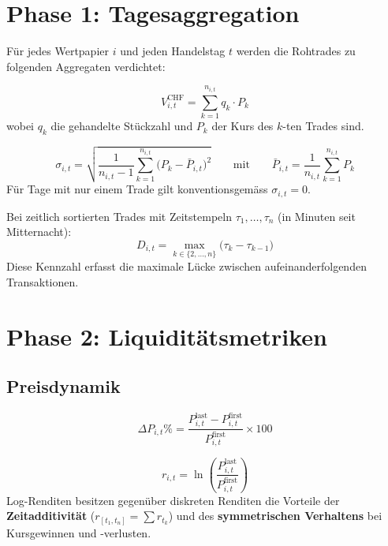 \documentclass[11pt, a4paper, oneside, openany]{report}
\begin{document}
\section{Phase 1: Tagesaggregation}

Für jedes Wertpapier $i$ und jeden Handelstag $t$ werden die Rohtrades zu folgenden Aggregaten verdichtet:

\begin{mathbox}
\[
  V_{i,t}^{\text{CHF}} = \sum_{k=1}^{n_{i,t}} q_k \cdot P_k
\]
wobei $q_k$ die gehandelte Stückzahl und $P_k$ der Kurs des $k$-ten Trades sind.
\end{mathbox}

\begin{mathbox}
\[
  \sigma_{i,t} = \sqrt{\frac{1}{n_{i,t}-1}\sum_{k=1}^{n_{i,t}}\bigl(P_k - \bar{P}_{i,t}\bigr)^2}
  \qquad \text{mit} \qquad
  \bar{P}_{i,t} = \frac{1}{n_{i,t}}\sum_{k=1}^{n_{i,t}} P_k
\]
Für Tage mit nur einem Trade gilt konventionsgemäss $\sigma_{i,t} = 0$.
\end{mathbox}

\begin{mathbox}
Bei zeitlich sortierten Trades mit Zeitstempeln $\tau_1, \ldots, \tau_{n}$ (in Minuten seit Mitternacht):
\[
  D_{i,t} = \max_{k \in \{2,\ldots,n\}} \bigl(\tau_k - \tau_{k-1}\bigr)
\]
Diese Kennzahl erfasst die maximale Lücke zwischen aufeinanderfolgenden Transaktionen.
\end{mathbox}

\section{Phase 2: Liquiditätsmetriken}

\subsection{Preisdynamik}

\begin{mathbox}
\[
  \Delta P_{i,t}\% = \frac{P_{i,t}^{\text{last}} - P_{i,t}^{\text{first}}}{P_{i,t}^{\text{first}}} \times 100
\]
\end{mathbox}

\begin{mathbox}
\[
  r_{i,t} = \ln\!\left(\frac{P_{i,t}^{\text{last}}}{P_{i,t}^{\text{first}}}\right)
\]
Log-Renditen besitzen gegenüber diskreten Renditen die Vorteile der \textbf{Zeitadditivität} ($r_{[t_1, t_n]} = \sum r_{t_k}$) und des \textbf{symmetrischen Verhaltens} bei Kursgewinnen und -verlusten.
\end{mathbox}
\end{document}
